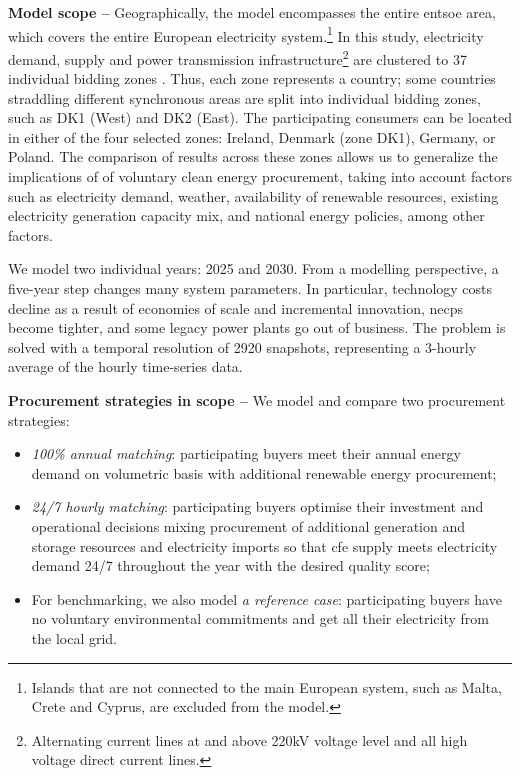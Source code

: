\textbf{Model scope --} Geographically, the model encompasses the entire \gls{entsoe} area, which covers the entire European electricity system.\footnote{Islands that are not connected to the main European system, such as Malta, Crete and Cyprus, are excluded from the model.}
In this study, electricity demand, supply and power transmission infrastructure\footnote{Alternating current lines at and above 220kV voltage level and all high voltage direct current lines.} are clustered to 37 individual bidding zones \cite{PyPSAEur-docs-spatialresolution}. 
Thus, each zone represents a country; some countries straddling different synchronous areas are split into individual bidding zones, such as DK1 (West) and DK2 (East).
The participating consumers can be located in either of the four selected zones: Ireland, Denmark (zone DK1), Germany, or Poland.
The comparison of results across these zones allows us to generalize the implications of of voluntary clean energy procurement, taking into account factors such as electricity demand, weather, availability of renewable resources, existing electricity generation capacity mix, and national energy policies, among other factors.

We model two individual years: 2025 and 2030. 
From a modelling perspective, a five-year step changes many system parameters.
In particular, technology costs decline as a result of economies of scale and incremental innovation, \gls{necp}s become tighter, and some legacy power plants go out of business.
The problem is solved with a temporal resolution of 2920 snapshots, representing a 3-hourly average of the hourly time-series data.

\textbf{Procurement strategies in scope --} We model and compare two procurement strategies: 

\begin{itemize}[-]
    \item \textit{100\% annual matching}: participating buyers meet their annual energy demand on volumetric basis with additional renewable energy procurement;
    \item \textit{24/7 hourly matching}: participating buyers optimise their investment and operational decisions mixing procurement of additional generation and storage resources and electricity imports so that \gls{cfe} supply meets electricity demand 24/7 throughout the year with the desired quality score;
    \item For benchmarking, we also model \textit{a reference case}: participating buyers have no voluntary environmental commitments and get all their electricity from the local grid.
\end{itemize}

